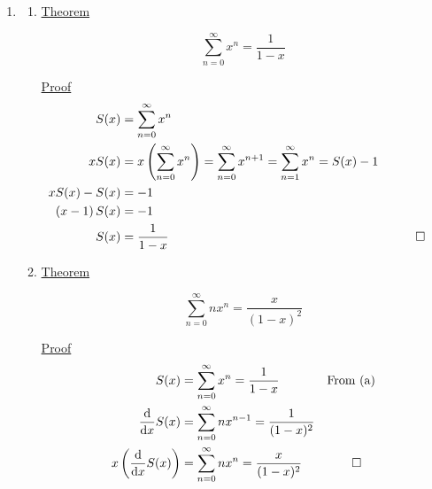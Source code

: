 \documentclass{homework}
\newcommand{\1}{\mathds{1}}
\begin{document}
\begin{enumerate}[label={\arabic*.}]
		\clearpage
		
		\item \begin{enumerate}
			\item \underline{Theorem}
					
				$$\sum_{n=0}^{\infty} x^n = \frac{1}{1 - x}$$
			
				\underline{Proof}
				\begin{align*}
					S(x) & = \sum_{n=0}^{\infty} x^n \\
					x S(x) & = x \left( \sum_{n=0}^\infty x^n \right) = \sum_{n=0}^\infty x^{n+1} = \sum_{n=1}^\infty x^n = S(x) - 1 \\
						x S(x) - S(x) & = -1 \\
						\left( x - 1 \right) S(x) & = -1 \\
						S(x) & = \frac{1}{1 - x} && \qed
				\end{align*}
			
			\item \underline{Theorem}
				
				$$\sum_{n=0}^\infty nx^n = \frac{x}{\left(1 - x\right)^2}$$
				
				\underline{Proof}
				\begin{align*}
					S(x) & = \sum_{n=0}^\infty x^n = \frac{1}{1-x} && \text{From (a)} \\
					\dv{x} S(x) & = \sum_{n=0}^{\infty} n x^{n-1} = \frac{1}{(1-x)^2} \\
					x \left( \dv{x} S(x) \right) & = \sum_{n=0}^{\infty} n x^{n} = \frac{x}{(1-x)^2} && \qed
				\end{align*}
		\end{enumerate}
	
		\clearpage
		

\end{enumerate}
\end{document}
